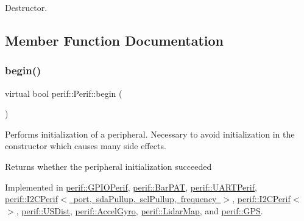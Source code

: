 Destructor. 

\subsection{Member Function Documentation}
\mbox{\label{classperif_1_1Perif_ae7f1d1a4e9cd2343d51abc4ee21000cf}} 
\subsubsection{\texorpdfstring{begin()}{begin()}}
{\footnotesize\ttfamily virtual bool perif\+::\+Perif\+::begin (\begin{DoxyParamCaption}{ }\end{DoxyParamCaption})\hspace{0.3cm}{\ttfamily [pure virtual]}}

Performs initialization of a peripheral. Necessary to avoid initialization in the constructor which causes many side effects.

\begin{DoxyReturn}{Returns}
whether the peripheral initialization succeeded 
\end{DoxyReturn}


Implemented in \mbox{\hyperlink{classperif_1_1GPIOPerif_a3e94e58e8441b85256567c193164ea69}{perif\+::\+G\+P\+I\+O\+Perif}}, \mbox{\hyperlink{classperif_1_1BarPAT_a591d84e84cfd9ec251d1ff8322e23ebb}{perif\+::\+Bar\+P\+AT}}, \mbox{\hyperlink{classperif_1_1UARTPerif_ac060109ead3a8910fabe57304afe1dbb}{perif\+::\+U\+A\+R\+T\+Perif}}, \mbox{\hyperlink{classperif_1_1I2CPerif_aa91b8eca31223fddd191a50b8a0a526d}{perif\+::\+I2\+C\+Perif$<$ port, sda\+Pullup, scl\+Pullup, frequency $>$}}, \mbox{\hyperlink{classperif_1_1I2CPerif_aa91b8eca31223fddd191a50b8a0a526d}{perif\+::\+I2\+C\+Perif$<$$>$}}, \mbox{\hyperlink{classperif_1_1USDist_a0920535901e083c9832dcde3639ab569}{perif\+::\+U\+S\+Dist}}, \mbox{\hyperlink{classperif_1_1AccelGyro_aebbf13d39d889c298103f16a02b4cce4}{perif\+::\+Accel\+Gyro}}, \mbox{\hyperlink{classperif_1_1LidarMap_a1d0db064c7664aa8014cbd9fe42773ff}{perif\+::\+Lidar\+Map}}, and \mbox{\hyperlink{classperif_1_1GPS_add9ec977f37224c9f2e87c5a932a55bd}{perif\+::\+G\+PS}}.

\mbox{\label{classperif_1_1Perif_a29c48598a861d85256c30e28af67f864}} 
